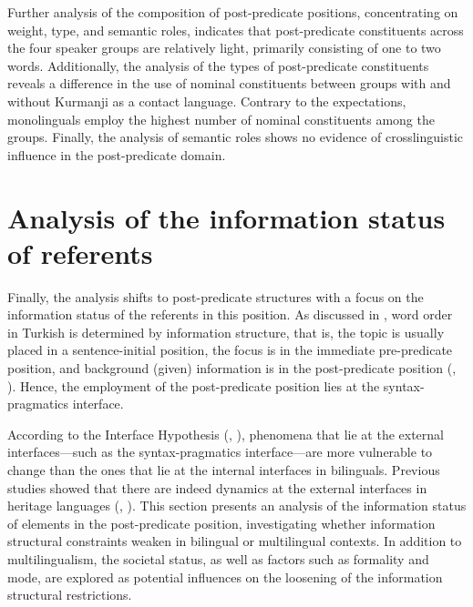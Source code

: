 Further analysis of the composition of post-predicate positions, concentrating on weight, type, and semantic roles, indicates that post-predicate constituents across the four speaker groups are relatively light, primarily consisting of one to two words. Additionally, the analysis of the types of post-predicate constituents reveals a difference in the use of nominal constituents between groups with and without Kurmanji as a contact language. Contrary to the expectations, monolinguals employ the highest number of nominal constituents among the groups. Finally, the analysis of semantic roles shows no evidence of crosslinguistic influence in the post-predicate domain.

\section{Analysis of the information status of referents}\label{sec:key:5.4}

Finally, the analysis shifts to post-predicate structures with a focus on the information status of the referents in this position. As discussed in , word order in Turkish is determined by information structure, that is, the topic is usually placed in a sentence-initial position, the focus is in the immediate pre-predicate position, and background (given) information is in the post-predicate position (\citealt{Erguvanli1984}, \citealt{Issever2003}). Hence, the employment of the post-predicate position lies at the syntax-pragmatics interface.

According to the Interface Hypothesis (\citealt{SoraceSerratrice2009}, \citealt{Sorace2011}), phenomena that lie at the external interfaces—such as the syntax-pragmatics interface—are more vulnerable to change than the ones that lie at the internal interfaces in bilinguals. Previous studies showed that there are indeed dynamics at the external interfaces in heritage languages (\citealt{MontrulPolinsky2011}, \citealt{pascual_y_cabo_illogical_2012}). This section presents an analysis of the information status of elements in the post-predicate position, investigating whether information structural constraints weaken in bilingual or multilingual contexts. In addition to multilingualism, the societal status, as well as factors such as formality and mode, are explored as potential influences on the loosening of the information structural restrictions.

